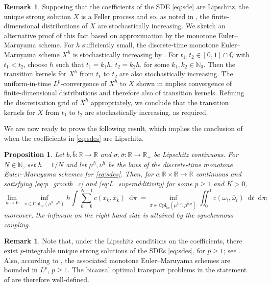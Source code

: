 \documentclass[oneside]{amsart}
\newtheorem{proposition}[theorem]{Proposition}
\theoremstyle{definition}
\newtheorem{remark}[theorem]{Remark}
\newcommand{\N}{\mathbb N}
\newcommand{\R}{\mathbb R}
\newcommand{\cplbc}{\mathrm{Cpl}_{\mathrm{bc}}}
\newcommand{\dt}{\mathop{}\!\mathrm{d}t}
\newcommand{\di}{\mathop{}\!\mathrm{d}}
\def\Q{{\mathbb Q}}
\def\R{{\mathbb R}}
\numberwithin{equation}{section}
\begin{document}
\begin{remark}\label{rem:stoch-mono-fdd-new}
    Supposing that the coefficients of the SDE \eqref{eq:sde} are Lipschitz, the unique strong solution $X$ is a Feller process and so, as noted in , the finite-dimensional distributions of $X$ are stochastically increasing. We sketch an alternative proof of this fact based on approximation by the monotone Euler--Maruyama scheme. For $h$ sufficiently small, the discrete-time monotone Euler--Maruyama scheme $X^h$ is stochastically increasing by . For $t_1, t_2 \in [0,1] \cap \Q$ with $t_1 < t_2$, choose $h$ such that $t_1 = k_1 h$, $t_2 = k_2 h$, for some $k_1, k_2 \in \N_0$. Then the transition kernels for $X^h$ from $t_1$ to $t_2$ are also stochastically increasing. The uniform-in-time $L^p$-convergence of $X^h$ to $X$ shown in  implies convergence of finite-dimensional distributions and therefore also of transition kernels. Refining the discretisation grid of $X^h$ appropriately, we conclude that the transition kernels for $X$ from $t_1$ to $t_2$ are stochastically increasing, as required.
\end{remark}

We are now ready to prove the following result, which implies the conclusion of  when the coefficients in \eqref{eq:sdes} are Lipschitz. 

\begin{proposition}\label{prop:bnt}
	Let $b, \bar{b}\colon \R \to \R$ and $\sigma, \bar{\sigma}\colon \R \to \R_+$ be Lipschitz continuous.
	For $N \in \N$, set $h = 1/N$ and let $\mu^h, \nu^h$ be the laws of the discrete-time monotone Euler--Maruyama schemes for \eqref{eq:sdes}.
	Then, for $c \colon \mathbb R\times \mathbb R \to\mathbb R$ continuous and satisfying \eqref{eq:p_growth_c} and \eqref{eq:L_superadditivity} for some $p \ge 1$ and $K>0$,
\[
\lim_{h\to 0}\;
\inf_{\pi\in\cplbc\!\left(\mu^h,\nu^h\right)}h\int\sum_{k=0}^{N - 1} c\!\left(x_k, \bar x_k\right)\di\pi\;
=
\inf_{\pi\in\cplbc(\mu^{b, \sigma},\mu^{\bar b, \bar \sigma})}\iint_0^1c\!\left(\omega_t,\bar{\omega}_t\right)\dt\di\pi;
\]
	moreover, the infimum on the right hand side is attained by the synchronous coupling.
\end{proposition}


\begin{remark}\label{rem:lipschitz-well-defined}
	Note that, under the Lipschitz conditions on the coefficients, there exist $p$-integrable unique strong solutions of the SDEs \eqref{eq:sdes}, for $p \geq 1$; see . Also, according to , the associated monotone Euler--Maruyama schemes are bounded in $L^p$, $p \geq 1$. The bicausal optimal transport problems in the statement of  are therefore well-defined.
\end{remark}
\end{document}
